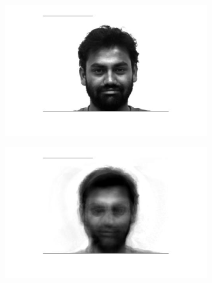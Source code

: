 \documentclass[a4paper]{iacas}
\begin{document}
\begin{figure}[!htbp]
	\centering
	
	\begin{subfigure}[b]{0.4\textwidth}
		\includegraphics[width=\textwidth]{4102.jpg}
		\caption{}
		\label{fig:4102}
	\end{subfigure}
	\begin{subfigure}[b]{0.4\textwidth}
		\includegraphics[width=\textwidth]{4101.jpg}
		\caption{}
		\label{fig:4101}
	\end{subfigure}
	

\end{figure}
\end{document}
